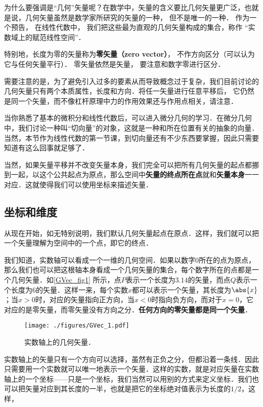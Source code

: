 为什么要强调是“几何”矢量呢？在数学中，矢量的含义要比几何矢量更广泛，也就是说，几何矢量虽然是数学家所研究的矢量的一种， 但不是唯一的一种． 作为一个预告， 在线性代数中， 我们把这些最为直观的几何矢量构成的集合，称作 “实数域上的赋范线性空间”．

特别地，长度为零的矢量称为\textbf{零矢量（zero vector）}， 不作方向区分（可以认为它与任何矢量平行）． 零矢量依然是矢量， 要注意和数字零进行区分．

需要注意的是，为了避免引入过多的要素从而导致概念过于复杂，我们目前讨论的几何矢量只有两个本质属性，长度和方向．将任一矢量进行任意平移后， 它仍然是同一个矢量，而不像杠杆原理中力的作用效果还与作用点相关，请注意．

当你熟悉了基本的微积分和线性代数后，可以进入微分几何的学习．在微分几何中，我们讨论一种叫“切向量”的对象，这就是一种和所在位置有关的抽象的向量．当然，本节作为线性代数的第一节课，到切向量还有不少东西要掌握，因此只需要知道有这么回事就足够了．


当然，如果矢量平移并不改变矢量本身，我们完全可以把所有几何矢量的起点都挪到一起，以这个公共起点为原点，那么空间中\textbf{矢量的终点所在点}就和\textbf{矢量本身}一一对应．这就使得我们可以使用坐标来描述矢量．




\subsection{坐标和维度}

从现在开始，如无特别说明，我们默认几何矢量起点在原点．这样，我们就可以把一个矢量理解为空间中的一个点，即它的终点．

我们知道，实数轴可以看成一个一维的几何空间．如果以数字$0$所在的点为原点，那么我们也可以把这根轴本身看成一个几何矢量的集合，每个数字所在的点都是一个几何矢量．如\autoref{GVec_fig1} 所示，点$P$表示一个长度为$3.14$的矢量，而点$Q$表示一个长度为$6$的矢量．这样一来，每个实数$x$都可以表示一个矢量，其长度为$\abs{x}$；当$x>0$时，对应的矢量指向正方向，当$x<0$时指向负方向，而对于$x=0$，它对应的是零矢量，而零矢量没有方向之分．\textbf{任何方向的零矢量都是同一个矢量}．

\begin{figure}[ht]
\centering
\texttt{[image: ./figures/GVec\_1.pdf]}
\caption{实数轴上的几何矢量．} \label{GVec_fig1}
\end{figure}

实数轴上的矢量只有一个方向可以选择，虽然有正负之分，但都沿着一条线．因此只需要用一个实数就可以唯一地表示一个矢量．这样的实数，就是对应矢量在实数轴上的一个坐标——只是一个坐标，我们当然可以用别的方式来定义坐标．我们也可以把矢量对应到其长度的一半，也就是把它的坐标绝对值表示为长度的$1/2$，这样，

